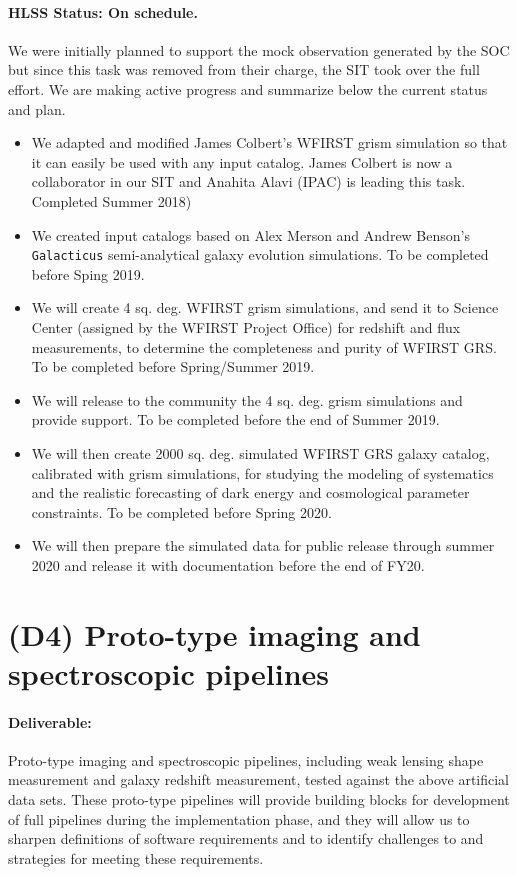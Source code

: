 \paragraph*{HLSS Status: On schedule.} We were initially planned to support the mock observation generated by the SOC but since this task was removed from their charge, the SIT took over the full effort. We are making active progress and summarize below the current status and plan.
\begin{itemize}
\item We adapted and modified James Colbert's WFIRST grism simulation so that it can easily be used with any input catalog. James Colbert is now a collaborator in our SIT and Anahita Alavi (IPAC) is leading this task. Completed Summer 2018)
\item We created input catalogs based on Alex Merson and Andrew Benson's \texttt{Galacticus} semi-analytical galaxy evolution simulations. To be completed before Sping 2019.
\item We will create 4 sq. deg. WFIRST grism simulations, and send it to Science Center (assigned by the WFIRST Project Office) for redshift and flux measurements, to determine the completeness and purity of WFIRST GRS. To be completed before Spring/Summer 2019.
\item We will release to the community the 4 sq. deg. grism simulations and provide support. To be completed before the end of Summer 2019.
\item We will then create 2000 sq. deg. simulated WFIRST GRS galaxy catalog, calibrated with grism simulations, for studying the modeling of systematics and the realistic forecasting of dark energy and cosmological parameter constraints. To be completed before Spring 2020.
\item We will then prepare the simulated data for public release through summer 2020 and release it with documentation before the end of FY20.
\end{itemize}


\section*{(D4) Proto-type imaging and spectroscopic pipelines}

\paragraph*{Deliverable:} Proto-type imaging and spectroscopic pipelines,
including weak lensing shape measurement and galaxy redshift measurement, tested
against the above artificial data sets. These proto-type pipelines will provide
building blocks for development of full pipelines during the implementation
phase, and they will allow us to sharpen definitions of software requirements
and to identify challenges to and strategies for meeting these requirements.

